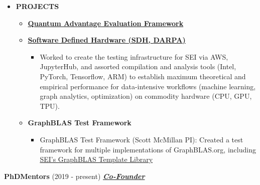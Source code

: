 \documentclass{article}
\newcommand{\employer}[3]{{ \textbf{#1} (#2) \underline{\textbf{\emph{#3}}}\\  }}
\begin{document}
\vspace{1mm}
    \begin{itemize}
      \item \textbf{PROJECTS}
      \begin{itemize}
        \item \textcolor{red}{\href{https://www.sei.cmu.edu/our-work/quantum-computing/index.cfm}{\textbf{Quantum Advantage Evaluation Framework}}}
        \item \textbf{\href{https://www.darpa.mil/program/software-defined-hardware}{Software Defined Hardware (SDH, \href{http://www.darpa.mil/default.aspx}{DARPA})}}
        \begin{itemize}
            \item Worked to create the testing infrastructure for SEI via AWS, JupyterHub, and assorted compilation and analysis tools (Intel, PyTorch, Tensorflow, ARM) to establish maximum theoretical and empirical performance for data-intensive workflows (machine learning, graph analytics, optimization) on commodity hardware (CPU, GPU, TPU). 
        \end{itemize}
        
        \item \textbf{GraphBLAS Test Framework}
        \begin{itemize}
            \item GraphBLAS Test Framework (Scott McMillan PI): 
Created a test framework for multiple implementations of GraphBLAS.org, including \href{https://github.com/cmu-sei/gbtl}{SEI’s GraphBLAS Template Library}

        \end{itemize}
        
        \end{itemize}
    \end{itemize}

\employer{PhDMentors}{2019 - present}{Co-Founder}
\end{document}
